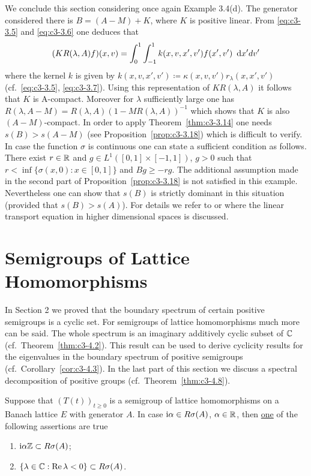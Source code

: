 We conclude this section considering once again Example 3.4(d).
The generator considered there is $B = (A - M) + K$, where $K$ is
%
positive linear. 
From \eqref{eq:c3-3.5} and \eqref{eq:c3-3.6} one deduces that 
\[
(KR(\lambda,A)f)(x,v) = \int_{0}^{1}\int_{-1}^{1} k(x,v,x',v')f(x',v')~\mathop{}\!\mathrm{d}{x}'dv'
\]
where the kernel $k$ is given by $k(x,v,x',v') \coloneqq  \kappa(x,v,v')r_{\lambda}(x,x',v')$ (cf.\ \eqref{eq:c3-3.5}, \eqref{eq:c3-3.7}). 
Using this representation of $KR(\lambda,A)$ it follows that $K$ is A-compact. 
Moreover for $\lambda$ sufficiently large one has $R(\lambda,A-M) = R(\lambda,A)(1 - MR(\lambda,A))^{-1}$ which shows that $K$ is also $(A-M)$-compact. 
In order to apply Theorem~\ref{thm:c3-3.14} one needs $s(B) > s(A-M)$ (see Proposition~\ref{prop:c3-3.18}) which is difficult to verify. 
In case the function $\sigma$ is continuous one can state a sufficient condition as follows.
There exist $r \in \mathbb{R} $ and $g \in L^{1}([0,1]\times[-1,1])$, $g > 0$ such that $r < \inf\{\sigma(x,0) : x \in [0,1]\}$ and $Bg \geq -rg$.
The additional assumption made in the second part of Proposition~\ref{prop:c3-3.18} is not satisfied in this example. 
Nevertheless one can show that $s(B)$ is strictly dominant in this situation (provided that $s(B) > s(A)$). 
For details we refer to 
\marginpar{[Greiner (1984d)]}
\citet{greiner:1984d}  or \citet{voigt:1985} where the linear transport equation in higher dimensional spaces is discussed.

\section{Semigroups of Lattice Homomorphisms}\label{sec:c3-4}

In Section 2 we proved that the boundary spectrum of certain positive semigroups is a cyclic set. 
For semigroups of lattice homomorphisms much more can be said. The whole spectrum is an imaginary additively cyclic subset of $\mathbb{C} $ (cf.\ Theorem~\ref{thm:c3-4.2}). 
This result can be used to derive cyclicity results for the eigenvalues in the boundary spectrum of positive semigroups (cf.\ Corollary~\ref{cor:c3-4.3}). 
In the last part of this section we discuss a spectral decomposition of positive groups (cf.\ Theorem~\ref{thm:c3-4.8}).

\begin{lemma}\label{lem:c3-4.1}
	Suppose that $(T(t))_{t \ge 0}$ is a semigroup of lattice homomorphisms on a Banach lattice $E$ with generator $A$.
	In case $\mathrm{i}\alpha \in R\sigma(A)$, $\alpha \in \mathbb{R} $, then \underline{one} of the following assertions are true
	\begin{enumerate}[\upshape (a)]
		\item $\mathrm{i}\alpha\mathbb{Z} \subset R\sigma(A)$;
		\item $\{\lambda \in \mathbb{C}  : \mathop{}\!\mathrm{Re}\,\lambda < 0 \} \subset R\sigma(A)$.
	\end{enumerate}
\end{lemma}

